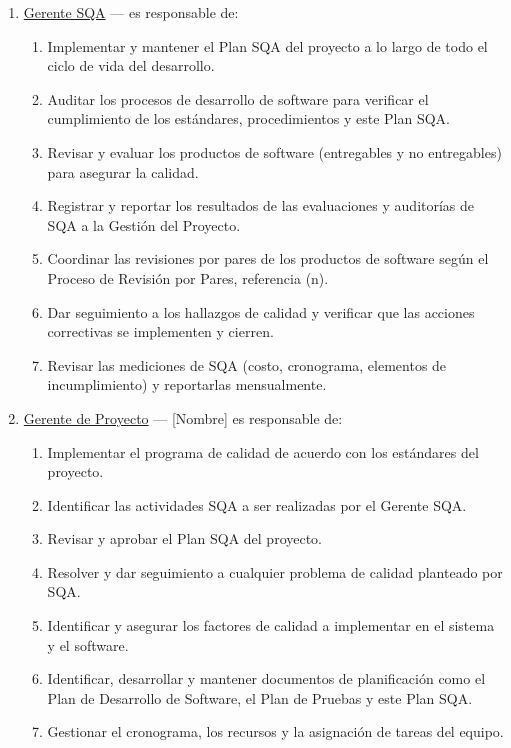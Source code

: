 \begin{enumerate}
    \item \underline{Gerente SQA} --- es responsable de:
    \begin{enumerate}
        \item Implementar y mantener el Plan SQA del proyecto a lo largo de todo el ciclo de vida del desarrollo.
        \item Auditar los procesos de desarrollo de software para verificar el cumplimiento de los estándares, procedimientos y este Plan SQA.
        \item Revisar y evaluar los productos de software (entregables y no entregables) para asegurar la calidad.
        \item Registrar y reportar los resultados de las evaluaciones y auditorías de SQA a la Gestión del Proyecto.
        \item Coordinar las revisiones por pares de los productos de software según el Proceso de Revisión por Pares, referencia (n).
        \item Dar seguimiento a los hallazgos de calidad y verificar que las acciones correctivas se implementen y cierren.
        \item Revisar las mediciones de SQA (costo, cronograma, elementos de incumplimiento) y reportarlas mensualmente.
    \end{enumerate}


    \item \underline{Gerente de Proyecto} --- [Nombre] es responsable de:
    \begin{enumerate}
        \item Implementar el programa de calidad de acuerdo con los estándares del proyecto.
        \item Identificar las actividades SQA a ser realizadas por el Gerente SQA.
        \item Revisar y aprobar el Plan SQA del proyecto.
        \item Resolver y dar seguimiento a cualquier problema de calidad planteado por SQA.
        \item Identificar y asegurar los factores de calidad a implementar en el sistema y el software.
        \item Identificar, desarrollar y mantener documentos de planificación como el Plan de Desarrollo de Software, el Plan de Pruebas y este Plan SQA.
        \item Gestionar el cronograma, los recursos y la asignación de tareas del equipo.
    \end{enumerate}


\end{enumerate}
